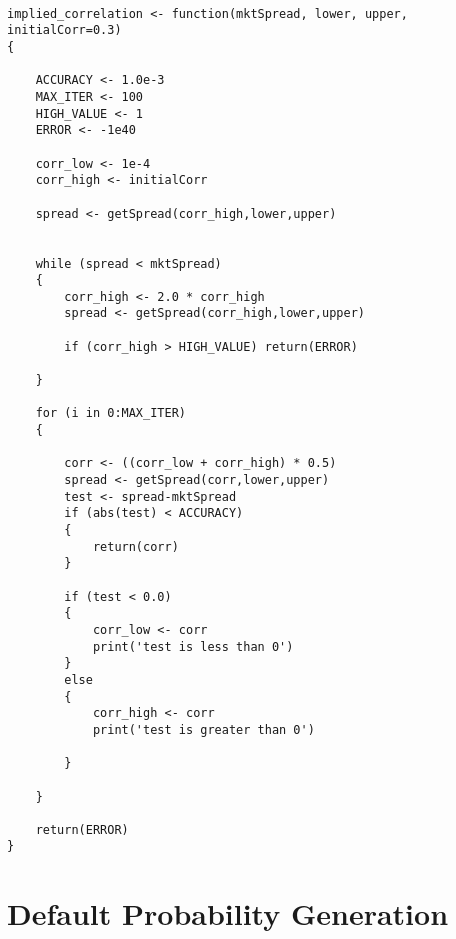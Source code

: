 \begin{singlespace}
\begin{lstlisting}

implied_correlation <- function(mktSpread, lower, upper, initialCorr=0.3)
{

	ACCURACY <- 1.0e-3
	MAX_ITER <- 100
	HIGH_VALUE <- 1
	ERROR <- -1e40

	corr_low <- 1e-4
	corr_high <- initialCorr
	
	spread <- getSpread(corr_high,lower,upper)


	while (spread < mktSpread)
	{
		corr_high <- 2.0 * corr_high
		spread <- getSpread(corr_high,lower,upper)

		if (corr_high > HIGH_VALUE) return(ERROR)

	}

	for (i in 0:MAX_ITER)
	{
			
		corr <- ((corr_low + corr_high) * 0.5)
		spread <- getSpread(corr,lower,upper)
		test <- spread-mktSpread
		if (abs(test) < ACCURACY)
		{
			return(corr)
		}

		if (test < 0.0) 
		{ 
			corr_low <- corr 
			print('test is less than 0')
		}
		else
		{
		  	corr_high <- corr
			print('test is greater than 0')

		}

	}

	return(ERROR)
}

\end{lstlisting}

\end{singlespace}

\section{Default Probability Generation}

